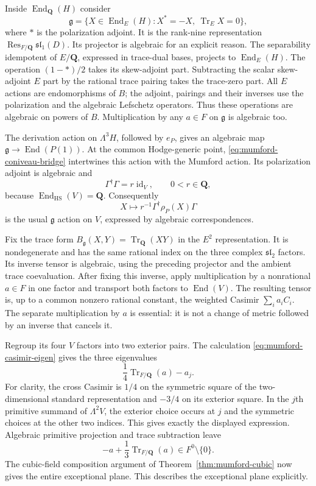 \documentclass[11pt]{article}
\theoremstyle{definition}
\theoremstyle{remark}
\begin{document}
Inside $\operatorname{End}_{\mathbf Q}(H)$ consider
\[
 \mathfrak g=\{X\in\operatorname{End}_E(H):
                    X^*=-X,\ \operatorname{Tr}_E X=0\},
\]
where $*$ is the polarization adjoint.  It is the rank-nine
representation $\operatorname{Res}_{F/\mathbf Q}\mathfrak{sl}_1(D)$.
Its projector is algebraic for an explicit reason.  The separability
idempotent of $E/\mathbf Q$, expressed in trace-dual bases, projects
to $\operatorname{End}_E(H)$.  The operation $(1-*)/2$ takes its
skew-adjoint part.  Subtracting the scalar skew-adjoint $E$ part by
the rational trace pairing takes the trace-zero part.
All $E$ actions are endomorphisms of $B$; the adjoint, pairings and
their inverses use the polarization and the algebraic Lefschetz
operators.  Thus these operations are algebraic on powers of $B$.
Multiplication by any $a\in F$ on $\mathfrak g$ is algebraic too.

The derivation action on $\Lambda^3H$, followed by $e_P$, gives an
algebraic map $\mathfrak g\to\operatorname{End}(P(1))$.
At the common Hodge-generic point, \eqref{eq:mumford-coniveau-bridge}
intertwines this action with the Mumford action.  Its polarization
adjoint is algebraic and
\[
 \Gamma^\dagger\Gamma=r\operatorname{id}_V,
 \qquad 0<r\in\mathbf Q,
\]
because $\operatorname{End}_{\mathrm{HS}}(V)=\mathbf Q$.
Consequently
\[
 X\longmapsto r^{-1}\Gamma^\dagger\rho_P(X)\Gamma
\]
is the usual $\mathfrak g$ action on $V$, expressed by algebraic
correspondences.

Fix the trace form $B_{\mathfrak g}(X,Y)=\operatorname{Tr}_{\mathbf Q}(XY)$
in the $E^2$ representation.  It is nondegenerate and has the same
rational index on the three complex $\mathfrak{sl}_2$ factors.
Its inverse tensor is algebraic, using the preceding projector and
the ambient trace coevaluation.  After fixing this inverse, apply
multiplication by a nonrational $a\in F$ in one factor and transport
both factors to $\operatorname{End}(V)$.  The resulting tensor is,
up to a common nonzero rational constant, the weighted Casimir
$\sum_i a_i C_i$.  The separate multiplication by $a$ is essential:
it is not a change of metric followed by an inverse that cancels it.

Regroup its four $V$ factors into two exterior pairs.  The calculation
\eqref{eq:mumford-casimir-eigen} gives the three eigenvalues
\[
 \frac14\operatorname{Tr}_{F/\mathbf Q}(a)-a_j.
\]
For clarity, the cross Casimir is $1/4$ on the symmetric square of
the two-dimensional standard representation and $-3/4$ on its
exterior square.  In the $j$th primitive summand of $\Lambda^2V$,
the exterior choice occurs at $j$ and the symmetric choices at the
other two indices.  This gives exactly the displayed expression.
Algebraic primitive projection and trace subtraction leave
\[
 -a+\frac13\operatorname{Tr}_{F/\mathbf Q}(a)\in F^0\setminus\{0\}.
\]
The cubic-field composition argument of
Theorem~\ref{thm:mumford-cubic} now gives the entire exceptional plane.
This describes the exceptional plane explicitly.
\end{document}
